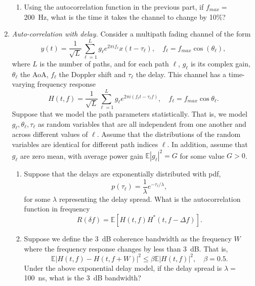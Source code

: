 \documentclass[11pt]{article}
\def\beq{\begin{equation}}
\def\eeq{\end{equation}}
\def\Exp{\mathbb{E}}
\begin{document}
\begin{enumerate}
\begin{enumerate}[label=(\alph*)]
\item Using the autocorrelation function in the previous part,
if $f_{max} = $ \SI{200}{Hz},
what is the time it takes the channel to change by 10\%?
\end{enumerate}

\item \emph{Auto-correlation with delay.}  Consider a multipath fading channel of the form
\[
    y(t) = \frac{1}{\sqrt{L}}\sum_{\ell = 1}^L g_\ell
        e^{2\pi if_\ell} x(t-\tau_\ell), \quad f_\ell = f_{max}\cos(\theta_\ell),
\]
where $L$ is the number of paths, and for each path $\ell$,
$g_\ell$ is its complex gain, $\theta_\ell$ the AoA, $f_\ell$ the Doppler shift
and $\tau_\ell$ the delay.  This channel has a time-varying frequency response
\beq \label{eq:Htf}
    H(t,f) = \frac{1}{\sqrt{L}}
    \sum_{\ell =1}^L g_\ell e^{2\pi  i(f_\ell t - \tau_\ell f)},
    \quad f_\ell = f_{max}\cos\theta_\ell.
\eeq
Suppose that we model the path parameters statistically.  That is,
we model $g_\ell,\theta_\ell,\tau_\ell$ as random variables that
are all independent
from one another and across different values of $\ell$.  Assume that the
distributions of the random variables are identical for different
path indices $\ell$.
In addition, assume that
$g_\ell$ are zero mean, with average power gain
$\Exp|g_\ell|^2 = G$ for some value $G > 0$.

\begin{enumerate}[label=(\alph*)]
\item Suppose that the delays are exponentially distributed with pdf,
\[
    p(\tau_\ell) = \frac{1}{\lambda}e^{-\tau_\ell/\lambda},
\]
for some $\lambda$ representing the delay spread.
What is the autocorrelation function in frequency
\[
    R(\delta f) = \Exp\left[ H(t,f)H^*(t,f-\Delta f) \right].
\]

\item Suppose we define the \SI{3}{dB} coherence bandwidth as the frequency $W$
where the frequency response changes by less than 3~dB.  That is,
\[
    \Exp|H(t,f)-H(t,f+W)|^2 \leq \beta \Exp|H(t,f)|^2, \quad \beta = 0.5.
\]
Under the above exponential delay model,
if the delay spread is $\lambda =$ \SI{100}{ns}, what is the \SI{3}{dB} bandwidth?
\end{enumerate}
%
%
%

\end{enumerate}
\end{document}
